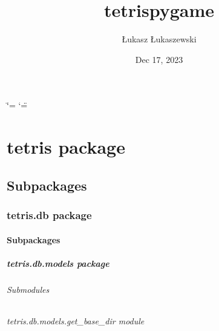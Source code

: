 \documentclass[letterpaper,10pt,english]{sphinxmanual}
\title{tetris\sphinxhyphen{}pygame}
\date{Dec 17, 2023}
\author{Łukasz Łukaszewski}
\begin{document}
\ifdefined\shorthandoff
  \ifnum\catcode`\=\string=\active\shorthandoff{=}\fi
  \ifnum\catcode`\"=\active{}\fi
\fi

\pagestyle{empty}
\sphinxmaketitle
\pagestyle{plain}
\sphinxtableofcontents
\pagestyle{normal}
\label{\detokenize{index::doc}}


\sphinxstepscope


\chapter{tetris package}
\label{\detokenize{tetris:tetris-package}}\label{\detokenize{tetris::doc}}

\section{Subpackages}
\label{\detokenize{tetris:subpackages}}
\sphinxstepscope


\subsection{tetris.db package}
\label{\detokenize{tetris.db:tetris-db-package}}\label{\detokenize{tetris.db::doc}}

\subsubsection{Subpackages}
\label{\detokenize{tetris.db:subpackages}}
\sphinxstepscope


\paragraph{tetris.db.models package}
\label{\detokenize{tetris.db.models:tetris-db-models-package}}\label{\detokenize{tetris.db.models::doc}}

\subparagraph{Submodules}
\label{\detokenize{tetris.db.models:submodules}}
\sphinxstepscope


\subparagraph{tetris.db.models.get\_base\_dir module}
\label{\detokenize{tetris.db.models.get_base_dir:module-tetris.db.models.get_base_dir}}\label{\detokenize{tetris.db.models.get_base_dir:tetris-db-models-get-base-dir-module}}\label{\detokenize{tetris.db.models.get_base_dir::doc}}
\sphinxstepscope
\end{document}
